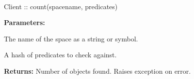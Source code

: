 \paragraph{}
\label{api:ruby:count}
\begin{rubycode}
Client :: count(spacename, predicates)
\end{rubycode}


\noindent\textbf{Parameters:}
\begin{description}[labelindent=\widthof{{\code{predicates}}},leftmargin=*,noitemsep,nolistsep,align=right]
\item[\code{spacename}] The name of the space as a string or symbol.
\item[\code{predicates}] A hash of predicates to check against.
\end{description}

\noindent\textbf{Returns:}
Number of objects found.  Raises exception on error.
